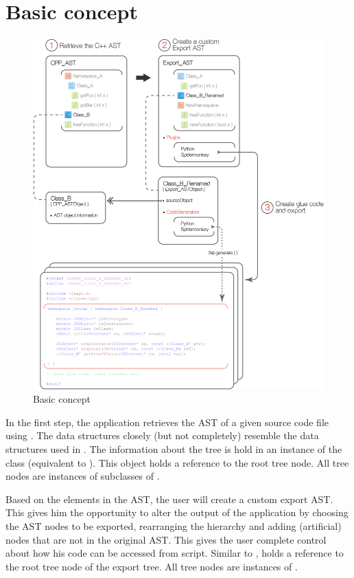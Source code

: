 \newpage
\section{Basic concept}
\label{sec:BasicConcept}

\begin{figure}[h] %
	\centering
		\includegraphics[scale=0.35]{Images/GUIApp_Concept.jpg}
	\caption{Basic concept}
	\label{fig:GUIAppConcept}
\end{figure}

In the first step, the application retrieves the  AST of a given source code file using . The data structures closely (but not completely) resemble the data structures used in . The information about the tree is hold in an instance of the  class  (equivalent to ). This object holds a reference to the root tree node. All tree nodes are instances of subclasses of .

Based on the elements in the  AST, the user will create a custom export AST. This gives him the opportunity to alter the output of the application by choosing the AST nodes to be exported, rearranging the hierarchy and adding (artificial) nodes that are not in the original  AST. This gives the user complete control about how his  code can be accessed from script. Similar to ,  holds a reference to the root tree node of the export tree. All tree nodes are instances of .

